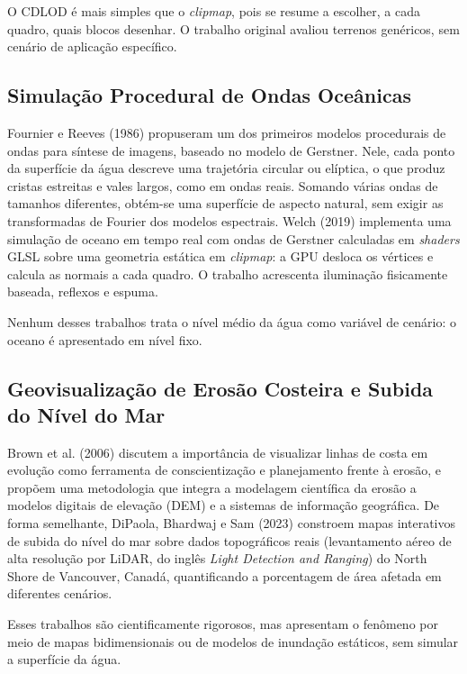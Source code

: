 \documentclass[conference]{IEEEtran}
\begin{document}
O CDLOD é mais simples que o \emph{clipmap}, pois se resume a escolher, a
cada quadro, quais blocos desenhar. O trabalho original avaliou terrenos
genéricos, sem cenário de aplicação específico.

\subsection{Simulação Procedural de Ondas Oceânicas}
\label{sub:ondas-rel}

Fournier e Reeves (1986) propuseram um dos primeiros modelos procedurais de
ondas para síntese de imagens, baseado no modelo de Gerstner. Nele, cada
ponto da superfície da água descreve uma trajetória circular ou elíptica, o
que produz cristas estreitas e vales largos, como em ondas reais. Somando
várias ondas de tamanhos diferentes, obtém-se uma superfície de aspecto
natural, sem exigir as transformadas de Fourier dos modelos espectrais. Welch (2019)
implementa uma simulação de oceano em tempo real com ondas de Gerstner
calculadas em \emph{shaders} GLSL sobre uma geometria estática em
\emph{clipmap}: a GPU desloca os vértices e calcula as normais a cada quadro.
O trabalho acrescenta iluminação fisicamente baseada, reflexos e espuma.

Nenhum desses trabalhos trata o nível médio da água como variável de
cenário: o oceano é apresentado em nível fixo.

\subsection{Geovisualização de Erosão Costeira e Subida do Nível do Mar}
\label{sub:geovis}

Brown et al. (2006) discutem a importância de visualizar linhas de costa em
evolução como ferramenta de conscientização e planejamento frente à erosão,
e propõem uma metodologia que integra a modelagem científica da erosão a
modelos digitais de elevação (DEM) e a sistemas de informação geográfica.
De forma semelhante, DiPaola, Bhardwaj e Sam (2023) constroem mapas
interativos de subida do nível do mar sobre dados topográficos reais
(levantamento aéreo de alta resolução por LiDAR, do inglês \emph{Light
Detection and Ranging}) do North Shore de Vancouver, Canadá,
quantificando a porcentagem de área afetada em diferentes cenários.

Esses trabalhos são cientificamente rigorosos, mas apresentam o fenômeno por
meio de mapas bidimensionais ou de modelos de inundação estáticos, sem
simular a superfície da água.
\end{document}
